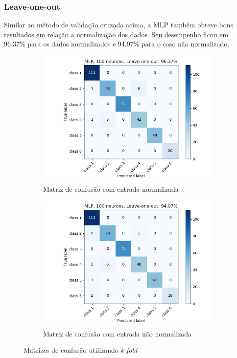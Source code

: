 \documentclass[paper=a4, fontsize=11pt]{scrartcl}
\numberwithin{equation}{section}		%
\numberwithin{figure}{section}			%
\numberwithin{table}{section}				%
\begin{document}
	\subsubsection{Leave-one-out}
	
	Similar ao método de validação cruzada acima, a MLP também obteve bons resultados em relação a normalização dos dados.
    Seu desempenho ficou em 96.37\% para os dados normalizados e 94.97\% para o caso não normalizado.
	\begin{figure}[h!]
		\begin{subfigure}{.5\textwidth}
			\centering
			\includegraphics[width=\linewidth]{img/q3_mlp_loo_norm.png}
			\caption{Matriz de confusão com entrada normalizada}
			\label{fig:q3loonorm}
		\end{subfigure}%
		\begin{subfigure}{.5\textwidth}
			\centering
			\includegraphics[width=\linewidth]{img/q3_mlp_loo_notNorm.png}
			\caption{Matriz de confusão com entrada não normalizada}
			\label{fig:q3loonotnorm}
		\end{subfigure}
		\caption{Matrizes de confusão utilizando \textit{k-fold}}
		\label{fig:MLP_confusao_LOO}
	\end{figure}
	
\end{document}
